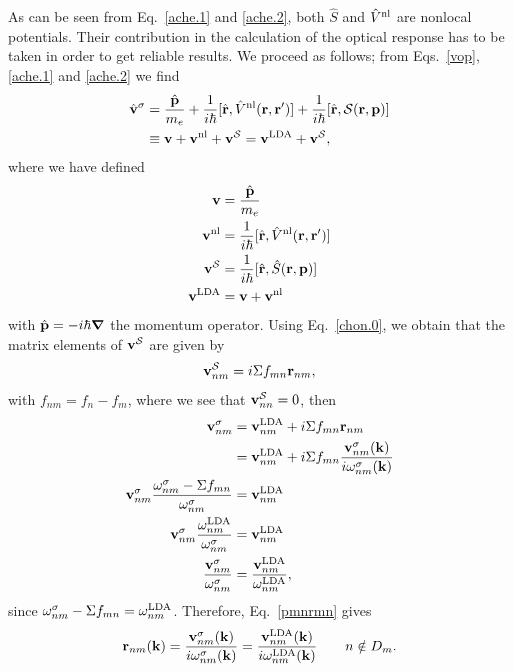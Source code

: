 \documentclass[floatfix,prb,aps,superscriptaddress,11pt,preprint,letterpaper]{revtex4}
\begin{document}
As can be seen from Eq.~\eqref{ache.1} and \eqref{ache.2},
both $\hat S$ and $\hat V^{\mathrm{nl}}$ are nonlocal potentials. Their contribution 
in the calculation of the optical response has to be taken in order to
get reliable results.\cite{ask-nicolas??}
We proceed as follows; from Eqs.~\eqref{vop}, \eqref{ache.1} and
\eqref{ache.2}
 we find
\begin{align}\label{vop2}
\hat{\mathbf{v}}^\sigma&=
\frac{\hat{\mathbf{p}}}{m_e}
+
\frac{1}{i\hbar}[\hat{\mathbf{r}},\hat V^{\mathrm{nl}}(\mathbf{r},\mathbf{r}')]
+
\frac{1}{i\hbar}[\hat{\mathbf{r}},{\cal S}(\mathbf{r},\mathbf{p})]
\nonumber\\
&\equiv
\mathbf{v}
+
\mathbf{v}^{\mathrm{nl}}
+\mathbf{v}^{\cal S}
=
\mathbf{v}^{\mathrm{LDA}}
+\mathbf{v}^{\cal S}
,
\end{align}
where we have defined
\begin{align}\label{conhr}
\mathbf{v}
&=\frac{\hat{\mathbf{p}}}{m_e}
\nonumber\\
\mathbf{v}^{\mathrm{nl}}
&=
\frac{1}{i\hbar}[\hat{\mathbf{r}},\hat V^{\mathrm{nl}}(\mathbf{r},\mathbf{r}')]
\nonumber\\
\mathbf{v}^{\cal S}
&=
\frac{1}{i\hbar}[\hat{\mathbf{r}},\hat S(\mathbf{r},\mathbf{p})]
\nonumber\\
\mathbf{v}^{\mathrm{LDA}}
&=
\mathbf{v}
+\mathbf{v}^{\mathrm{nl}}
\end{align}  
with $\hat{\mathbf{p}}=-i\hbar\boldsymbol{\nabla}$ the momentum operator.
Using Eq.~\eqref{chon.0}, we obtain that the
matrix elements of $\mathbf{v}^{\cal S}$ are given by
\begin{equation}\label{chon.2} 
\mathbf{v}^{\cal S}_{nm}=i\Sigma f_{mn}\mathbf{r}_{nm},
\end{equation}
with $f_{nm}=f_n-f_m$,
where we see that $\mathbf{v}^{\cal S}_{nn}=0$, then
\begin{align}\label{chon.8}
\mathbf{v}^\sigma_{nm}
&=
\mathbf{v}^{\mathrm{LDA}}_{nm}+i\Sigma f_{mn}\mathbf{r}_{nm}
\nonumber\\
&=
\mathbf{v}^{\mathrm{LDA}}_{nm}+i\Sigma f_{mn}\frac{\mathbf{v}^\sigma_{nm}(\mathbf{k})}{i\omega^\sigma_{nm}(\mathbf{k})}
\nonumber\\
\mathbf{v}^\sigma_{nm}
\frac{\omega^\sigma_{nm}-\Sigma f_{mn}}{\omega^\sigma_{nm}}
&=
\mathbf{v}^{\mathrm{LDA}}_{nm}
\nonumber\\
\mathbf{v}^\sigma_{nm}
\frac{\omega^{\mathrm{LDA}}_{nm}}{\omega^\sigma_{nm}}
&=
\mathbf{v}^{\mathrm{LDA}}_{nm}
\nonumber\\
\frac{\mathbf{v}^\sigma_{nm}}{\omega^\sigma_{nm}}
&=
\frac{\mathbf{v}^{\mathrm{LDA}}_{nm}}{\omega^{\mathrm{LDA}}_{nm}}
,
\end{align}
since
$\omega^\sigma_{nm}-\Sigma f_{mn}=\omega^{\mathrm{LDA}}_{nm}$. Therefore, 
Eq.~\eqref{pmnrmn} gives
\begin{align}\label{chon.10}
\mathbf{r}_{nm}(\mathbf{k})
=
\frac{\mathbf{v}^\sigma_{nm}(\mathbf{k})}{i\omega^\sigma_{nm}(\mathbf{k})}
=
\frac{\mathbf{v}^{\mathrm{LDA}}_{nm}(\mathbf{k})}{i\omega^{\mathrm{LDA}}_{nm}(\mathbf{k})}
\quad\quad n\notin D_m
.
\end{align}
\end{document}
